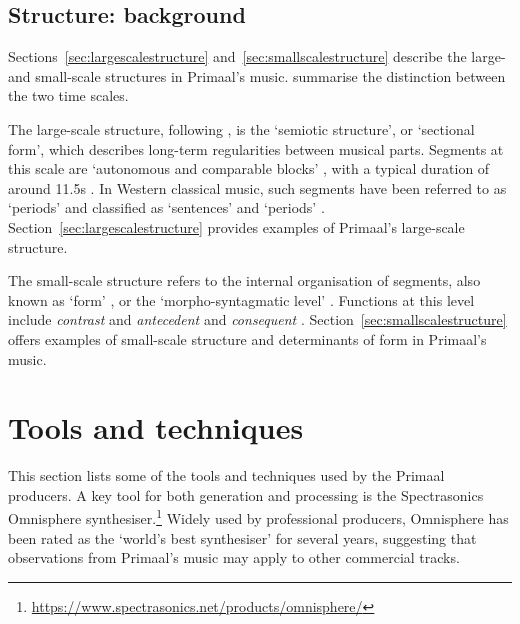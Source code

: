 \documentclass{article}
\begin{document}
\subsection{Structure: background}\label{sec:structurebackground}

Sections~\ref{sec:largescalestructure} and~\ref{sec:smallscalestructure} describe the large- and small-scale structures in Primaal's music. \citet[p.~13]{deruty2013methodological} summarise the distinction between the two time scales.

The large-scale structure, following \citet{bimbot2012semiotic}, is the `semiotic structure', or `sectional form', which describes long-term regularities between musical parts. Segments at this scale are `autonomous and comparable blocks' \citep{bimbot2010decomposition}, with a typical duration of around 11.5s \citep{deruty2013methodological}. In Western classical music, such segments have been referred to as `periods' \citep[pp.~149--150]{monelle2014linguistics} and classified as `sentences' and `periods' \citep{schoenberg1967fundamentals,caplin1998classical}. Section~\ref{sec:largescalestructure} provides examples of Primaal's large-scale structure.


The small-scale structure refers to the internal organisation of segments, also known as `form' \citep{caplin1998classical}, or the `morpho-syntagmatic level' \citep{bimbot2014semiotic}. Functions at this level include {\em contrast} \citep{bimbot2016system} and {\em antecedent} and {\em consequent} \citep{caplin1998classical}. Section~\ref{sec:smallscalestructure} offers examples of small-scale structure and determinants of form in Primaal's music.




\section{Tools and techniques}\label{sec:tools-and-techniques}

This section lists some of the tools and techniques used by the Primaal producers. A key tool for both generation and processing is the Spectrasonics Omnisphere synthesiser.\footnote{\url{https://www.spectrasonics.net/products/omnisphere/}} Widely used by professional producers, Omnisphere has been rated as the `world's best synthesiser' for several years, \citep{nagle2015omnisphere} suggesting that observations from Primaal's music may apply to other commercial tracks.
\end{document}
